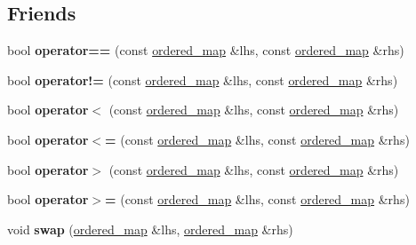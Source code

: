 \subsection*{Friends}
\begin{DoxyCompactItemize}
\item 
\mbox{\label{classtsl_1_1ordered__map_a51ff4fbe32e2c20ab5b1a3c71d4bbeb0}} 
bool {\bfseries operator==} (const \mbox{\hyperlink{classtsl_1_1ordered__map}{ordered\+\_\+map}} \&lhs, const \mbox{\hyperlink{classtsl_1_1ordered__map}{ordered\+\_\+map}} \&rhs)
\item 
\mbox{\label{classtsl_1_1ordered__map_af6b31b30b4fafcb7435ea60bb8e93ecc}} 
bool {\bfseries operator!=} (const \mbox{\hyperlink{classtsl_1_1ordered__map}{ordered\+\_\+map}} \&lhs, const \mbox{\hyperlink{classtsl_1_1ordered__map}{ordered\+\_\+map}} \&rhs)
\item 
\mbox{\label{classtsl_1_1ordered__map_a392306a40715aeccf7dd93165d8e30fe}} 
bool {\bfseries operator$<$} (const \mbox{\hyperlink{classtsl_1_1ordered__map}{ordered\+\_\+map}} \&lhs, const \mbox{\hyperlink{classtsl_1_1ordered__map}{ordered\+\_\+map}} \&rhs)
\item 
\mbox{\label{classtsl_1_1ordered__map_aee64ddd869e544e3fcd602ac5836b897}} 
bool {\bfseries operator$<$=} (const \mbox{\hyperlink{classtsl_1_1ordered__map}{ordered\+\_\+map}} \&lhs, const \mbox{\hyperlink{classtsl_1_1ordered__map}{ordered\+\_\+map}} \&rhs)
\item 
\mbox{\label{classtsl_1_1ordered__map_a37031e5a5f0ff63f489c52bf624b67c0}} 
bool {\bfseries operator$>$} (const \mbox{\hyperlink{classtsl_1_1ordered__map}{ordered\+\_\+map}} \&lhs, const \mbox{\hyperlink{classtsl_1_1ordered__map}{ordered\+\_\+map}} \&rhs)
\item 
\mbox{\label{classtsl_1_1ordered__map_a63d63cc7fb50a3afd7d25bd2abd4206d}} 
bool {\bfseries operator$>$=} (const \mbox{\hyperlink{classtsl_1_1ordered__map}{ordered\+\_\+map}} \&lhs, const \mbox{\hyperlink{classtsl_1_1ordered__map}{ordered\+\_\+map}} \&rhs)
\item 
\mbox{\label{classtsl_1_1ordered__map_a9513dc1efafa0d61570a1416201f5984}} 
void {\bfseries swap} (\mbox{\hyperlink{classtsl_1_1ordered__map}{ordered\+\_\+map}} \&lhs, \mbox{\hyperlink{classtsl_1_1ordered__map}{ordered\+\_\+map}} \&rhs)
\end{DoxyCompactItemize}


